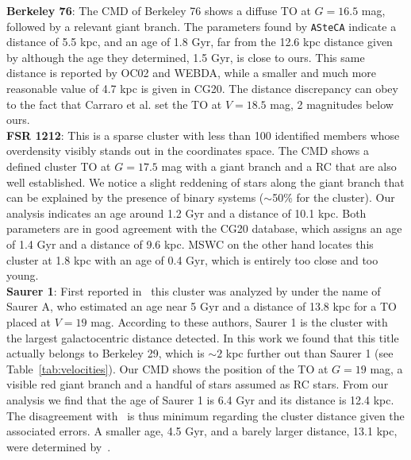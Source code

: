 \documentclass[referee]{aa}
\begin{document}
  \noindent \textbf{Berkeley 76}: The CMD of Berkeley 76 shows a diffuse TO at $G=16.5$
  mag, followed by a relevant giant branch. The parameters found by
  \texttt{ASteCA} indicate a distance of 5.5 kpc, and an age of 1.8 Gyr, far
  from the 12.6 kpc distance given
  by \cite{Carraro_2013_Five} although the age they determined, 1.5 Gyr, is
  close to ours. This same distance is reported by OC02 and WEBDA, while a
  smaller and much more reasonable value of 4.7 kpc is given in CG20.
  The distance discrepancy can obey to the fact that Carraro et al. set
  the TO at $V=18.5$ mag, 2 magnitudes below ours.\\

  \noindent \textbf{FSR 1212}: This is a sparse cluster with less than 100 identified 
  members whose overdensity visibly stands out in the coordinates space. The CMD
  shows a defined cluster TO at $G=17.5$ mag with a giant branch and a RC that
  are also well established. We notice a slight reddening of stars along the
  giant branch that can be explained by the presence of binary systems 
  ($\sim$50\% for the cluster).
  Our analysis indicates an age around 1.2 Gyr and a distance of 10.1
  kpc. Both parameters are in good agreement with the CG20 database, which
  assigns an age of 1.4 Gyr and a distance of 9.6 kpc. MSWC on the other hand
  locates this cluster at 1.8 kpc with an age of 0.4 Gyr, which is entirely too
  close and too young.\\

  \noindent \textbf{Saurer 1}: First reported in~\citet[][along with Saurer 3 and Saurer 6]
  {Saurer_1994} this cluster was analyzed by \cite{Carraro_2003} under
  the name of Saurer A, who estimated an age near 5 Gyr and a distance of 13.8
  kpc for a TO placed at $V=19$ mag. According to these authors, Saurer 1 is the
  cluster with the largest galactocentric distance detected. In this work we
  found that this title actually belongs to Berkeley 29, which is $\sim2$
  kpc further out than Saurer 1 (see Table~\ref{tab:velocities}).
  Our CMD shows the position of the TO at $G=19$ mag, a visible red giant
  branch and a handful of stars assumed as RC stars. From our analysis we find
  that the age of Saurer 1 is 6.4 Gyr and its distance is 12.4 kpc. The
  disagreement with~\cite{Carraro_2003} is thus minimum regarding the
  cluster distance given the associated errors. A smaller age, 4.5 Gyr, and
  a barely larger distance, 13.1 kpc, were determined
  by~\cite{Frinchaboy_2006}.\\
\end{document}
